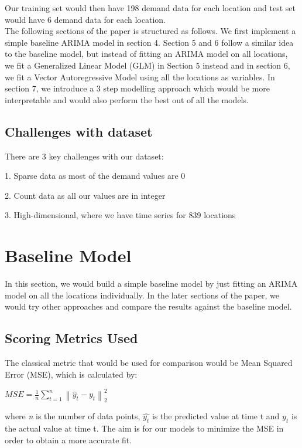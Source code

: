 \documentclass[nonblindrev,msom]{informs3} %
\begin{document}
\noindent Our training set would then have 198 demand data for each location and test set would have 6 demand data for each location. \\

\noindent The following sections of the paper is structured as follows. We first implement a simple baseline ARIMA model in section 4. Section 5 and 6 follow a similar idea to the baseline model, but instead of fitting an ARIMA model on all locations, we fit a Generalized Linear Model (GLM) in Section 5 instead and in section 6, we fit a Vector Autoregressive Model using all the locations as variables. In section 7, we introduce a 3 step modelling approach which would be more interpretable and would also perform the best out of all the models. 

\subsection{Challenges with dataset}

There are 3 key challenges with our dataset:

	1. Sparse data as most of the demand values are 0
	
	2. Count data as all our values are in integer
	
	3. High-dimensional, where we have time series for 839 locations


\newpage

\section{Baseline Model}
In this section, we would build a simple baseline model by just fitting an ARIMA model on all the locations individually. In the later sections of the paper, we would try other approaches and compare the results against the baseline model. 

\subsection{Scoring Metrics Used}
The classical metric that would be used for comparison would be Mean Squared Error (MSE), which is calculated by:

\begin{center}
    $\displaystyle MSE=\frac{1}{n}\sum_{t=1}^{n}\left \| \hat{y}_{t} - y_{t} \right \|_{2}^{2}$
\end{center}
where \textit{n} is the number of data points, $\hat{y_t}$ is the predicted value at time t and ${y_t}$ is the actual value at time t. The aim is for our models to minimize the MSE in order to obtain a more accurate fit. \\
\end{document}
